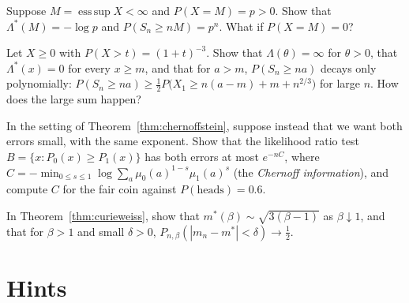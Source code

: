 \begin{exercise}[$\star\star$]\label{ex:endpoint}
Suppose $M=\operatorname{ess\,sup}X<\infty$ and $P(X=M)=p>0$. Show that $\Lambda^*(M)=-\log p$ and $P(S_n\ge nM)=p^n$. What if $P(X=M)=0$?
\end{exercise}

\begin{exercise}[$\star\star$]\label{ex:heavyld}
Let $X\ge0$ with $P(X>t)=(1+t)^{-3}$. Show that $\Lambda(\theta)=\infty$ for $\theta>0$, that $\Lambda^*(x)=0$ for every $x\ge m$, and that for $a>m$,
$P(S_n\ge na)$ decays only polynomially: $P(S_n\ge na)\ge\frac12P\bigl(X_1\ge n(a-m)+m+n^{2/3}\bigr)$ for large $n$. How does the large sum happen?
\end{exercise}

\begin{exercise}[$\star\star$]\label{ex:testcoin}
In the setting of Theorem~\ref{thm:chernoffstein}, suppose instead that we want both errors small, with the same exponent. Show that the likelihood ratio test
$B=\{x:P_0(x)\ge P_1(x)\}$ has both errors at most $e^{-nC}$, where $C=-\min_{0\le s\le1}\log\sum_a\mu_0(a)^{1-s}\mu_1(a)^s$ (the \emph{Chernoff information}), and compute $C$ for the fair coin
against $P(\text{heads})=0.6$.
\end{exercise}

\begin{exercise}[$\star\star$]\label{ex:curieweiss}
In Theorem~\ref{thm:curieweiss}, show that $m^*(\beta)\sim\sqrt{3(\beta-1)}$ as $\beta\downarrow1$, and that for $\beta>1$ and small $\delta>0$, $P_{n,\beta}(|m_n-m^*|<\delta)\to\frac12$.
\end{exercise}

\section{Hints}

